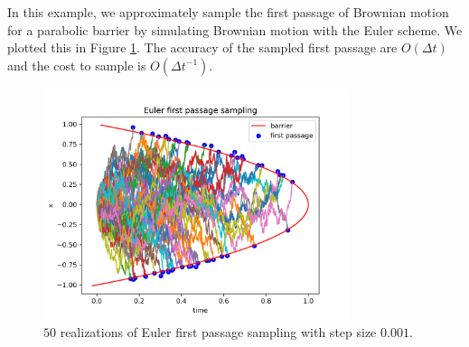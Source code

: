 \documentclass[a4paper,12pt]{article}
\begin{document}
\begin{example} \label{ex:euler first passage sampling}
    In this example, we approximately sample the first passage of Brownian motion
    for a parabolic barrier by simulating Brownian motion with the Euler scheme. We plotted
    this in Figure \ref{fig:Euler first passage para}. The accuracy of the sampled first passage
    are $O(\Delta t)$ and the cost to sample is $O(\Delta t ^{-1})$.

    \begin{figure}[h!]
        \centering
        \includegraphics[width=0.8\textwidth]{plots/Euler first passage para.png}
        \caption{ $50$ realizations of Euler first passage sampling with step size $0.001$.}
        \label{fig:Euler first passage para}
    \end{figure}
\end{example}
\end{document}
